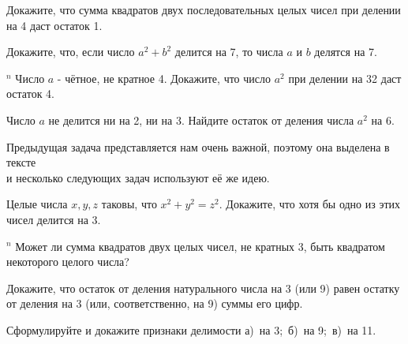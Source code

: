 \begin{thm}
    Докажите, что сумма квадратов двух последовательных целых чисел при делении на 4 даст остаток 1.
\end{thm}

\begin{thm}
    Докажите, что, если число $a^2 + b^2$ делится на 7, то числа $a$ и $b$ делятся на 7.
\end{thm}

\begin{thm} $^n$ \label{4.2 thm2} 
    Число $a$ - чётное, не кратное 4. Докажите, что число $a^2$ при делении на 32 даст остаток 4.
\end{thm}

\begin{thm}
    Число $a$ не делится ни на 2, ни на 3. Найдите остаток от деления числа $a^2$ на 6.
\end{thm}


\begin{center}
Предыдущая задача представляется нам очень важной, поэтому она выделена в тексте \\ и несколько следующих задач используют её же идею. 
\end{center}

\begin{thm}
    Целые числа $x, y, z$ таковы, что $x^2 + y^2 = z^2$. Докажите, что хотя бы одно из этих чисел делится на 3.
\end{thm}

\begin{thm} $^n$ \label{4.2 thm3}
    Может ли сумма квадратов двух целых чисел, не кратных 3, быть квадратом некоторого целого числа?
\end{thm}

\begin{thm}
    Докажите, что остаток от деления натурального числа на 3 (или 9) равен остатку от деления на 3 (или, соответственно, на 9) суммы его цифр.
\end{thm}

\begin{thm}
    Сформулируйте и докажите признаки делимости а)~на 3;~б)~на 9;~в)~на 11.
\end{thm}

